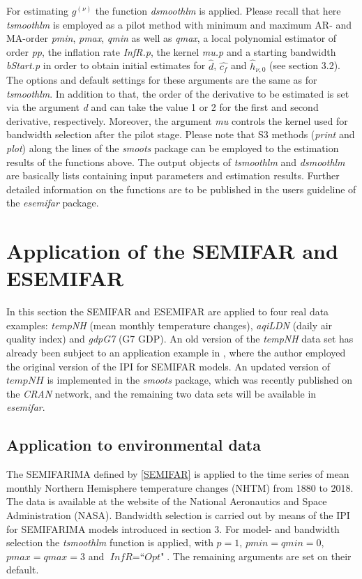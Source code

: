 \documentclass[12pt]{article}
\begin{document}
For estimating $g^{(\nu)}$ the function \textit{dsmoothlm} is applied. Please recall that here \textit{tsmoothlm} is employed as a pilot method with minimum and maximum AR- and MA-order \textit{pmin}, \textit{pmax}, \textit{qmin} as well as \textit{qmax}, a local polynomial estimator of order \textit{pp}, the inflation rate \textit{InfR.p}, the kernel \textit{mu.p} and a starting bandwidth \textit{bStart.p} in order to obtain initial estimates for $\hat{d}$, $\hat{c_f}$ and $\hat{h}_{\nu,0}$ (see section 3.2). The options and default settings for these arguments are the same as for \textit{tsmoothlm}. In addition to that, the order of the derivative to be estimated is set via the argument \textit{d} and can take the value 1 or 2 for the first and second derivative, respectively. Moreover, the argument \textit{mu} controls the kernel used for bandwidth selection after the pilot stage. Please note that S3 methods (\textit{print} and \textit{plot}) along the lines of the \textit{smoots} package can be employed to the estimation results of the functions above. The output objects of \textit{tsmoothlm} and \textit{dsmoothlm} are basically lists containing input parameters and estimation results. Further detailed information on the functions are to be published in the users guideline of the \textit{esemifar} package.       


\section{Application of the SEMIFAR and ESEMIFAR}
In this section the SEMIFAR and ESEMIFAR are applied to four real data examples: \textit{tempNH} (mean monthly temperature changes), \textit{aqiLDN} (daily air quality index) and \textit{gdpG7} (G7 GDP). An old version of the \textit{tempNH} data set has already been subject to an application example in \citet{feng2007asymptotic}, where the author employed the original version of the IPI for SEMIFAR models. An updated version of $\textit{tempNH}$ is implemented in the \textit{smoots} package, which was recently published on the \textit{CRAN} network, and the remaining two data sets will be available in \textit{esemifar}. 

\subsection{Application to environmental data}
The SEMIFARIMA defined by \eqref{SEMIFAR} is applied to the time series of mean monthly Northern Hemisphere temperature changes (NHTM) from 1880 to 2018. The data is available at the website of the National Aeronautics and Space Administration (NASA). Bandwidth selection is carried out by means of the IPI for SEMIFARIMA models introduced in section 3. For model- and bandwidth selection the \textit{tsmoothlm} function is applied, with $\textit{p} = 1$, $\textit{pmin} = \textit{qmin} = 0$, $\textit{pmax} = \textit{qmax} = 3$ and $\textit{InfR} = \textit{``Opt"}$. The remaining arguments are set on their default. 
\end{document}
